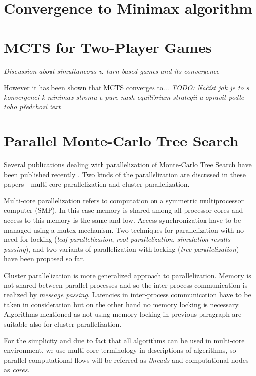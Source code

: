\section{Convergence to Minimax algorithm}
\label{sec_minimax_convergence}



\section{MCTS for Two-Player Games}
\emph{Discussion about simultaneous v. turn-based games and its convergence}

However it has been shown that MCTS converges to... \emph{TODO: Načíst jak je to s konvergencí k
minimax stromu a pure nash equilibrium strategii a opravit podle toho předchozí text}


\section{Parallel Monte-Carlo Tree Search}

Several publications dealing with parallelization of Monte-Carlo Tree Search have been published
recently \cites{Cazenave2007}{Chaslot2008}{Teytaud2008}. Two kinds of the parallelization are
discussed in these papers - multi-core parallelization and cluster parallelization.

Multi-core parallelization refers to computation on a symmetric multiprocessor computer (SMP). In
this case memory is shared among all processor cores and access to this memory is the same and low.
Access synchronization have to be managed using a mutex mechanism. Two techniques for
parallelization with no need for locking (\emph{leaf parallelization}, \emph{root parallelization},
\emph{simulation results passing}),
and two variants of parallelization with locking (\emph{tree parallelization}) have been proposed so
far. 

Cluster parallelization is more generalized approach to parallelization. Memory is not shared
between parallel processes and so the inter-process communication is realized by \emph{message
passing}. Latencies in inter-process communication have to be taken in consideration but on the
other hand no memory locking is necessary. Algorithms mentioned as not using memory locking in
previous paragraph are suitable also for cluster parallelization.

For the simplicity and due to fact that all algorithms can be used in multi-core environment, we 
use multi-core terminology in descriptions of algorithms, so parallel
computational flows will be referred as \emph{threads} and computational nodes as \emph{cores}.

